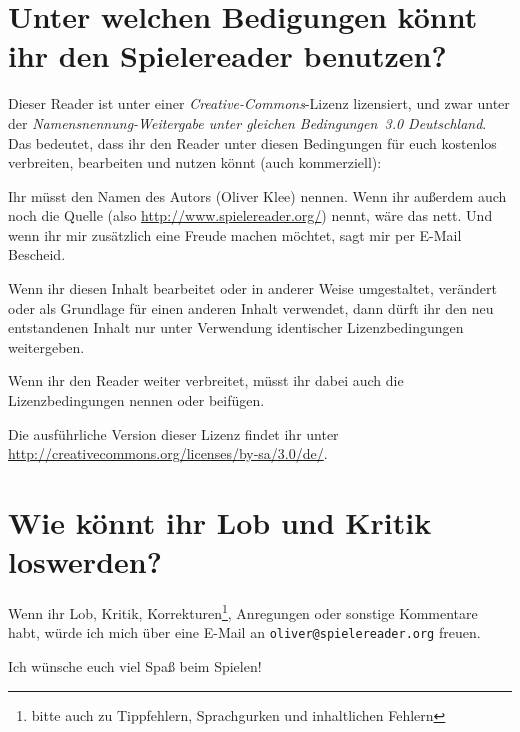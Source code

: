 \section{Unter welchen Bedigungen könnt ihr den Spielereader benutzen?}
Dieser Reader ist unter einer \emph{Creative-Commons}-Lizenz lizensiert, und zwar unter der \emph{Namensnennung-Weitergabe unter gleichen Bedingungen~3.0 Deutschland}. Das bedeutet, dass ihr den Reader unter diesen Bedingungen für euch kostenlos verbreiten, bearbeiten und nutzen könnt (auch kommerziell):
\begin{description}
  \item[Namensnennung.] Ihr müsst den Namen des Autors (Oliver Klee) nennen. Wenn ihr außerdem auch noch die Quelle (also \url{http://www.spielereader.org/}) nennt, wäre das nett. Und wenn ihr mir zusätzlich eine Freude machen möchtet, sagt mir per E-Mail Bescheid.
  \item[Weitergabe unter gleichen Bedingungen.] Wenn ihr diesen Inhalt bearbeitet oder in anderer Weise umgestaltet, verändert oder als Grundlage für einen anderen Inhalt verwendet, dann dürft ihr den neu entstandenen Inhalt nur unter Verwendung identischer Lizenzbedingungen weitergeben.
  \item Wenn ihr den Reader weiter verbreitet, müsst ihr dabei auch die Lizenzbedingungen nennen oder beifügen.
\end{description} 

Die ausführliche Version dieser Lizenz findet ihr unter \url{http://creativecommons.org/licenses/by-sa/3.0/de/}.

\section{Wie könnt ihr Lob und Kritik loswerden?}
Wenn ihr Lob, Kritik, Korrekturen\footnote{bitte auch zu Tippfehlern, Sprachgurken und inhaltlichen Fehlern}, Anregungen oder sonstige Kommentare habt, würde ich mich über eine E-Mail an \texttt{oliver@spielereader.org} freuen.

Ich wünsche euch viel Spaß beim Spielen!
